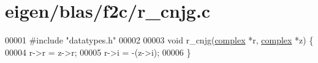 \hypertarget{eigen_2blas_2f2c_2r__cnjg_8c_source}{}\section{eigen/blas/f2c/r\+\_\+cnjg.c}
\label{eigen_2blas_2f2c_2r__cnjg_8c_source}

\begin{DoxyCode}
00001 \textcolor{preprocessor}{#include "datatypes.h"}    
00002 
00003 \textcolor{keywordtype}{void} r\_cnjg(\hyperlink{structcomplex}{complex} *r, \hyperlink{structcomplex}{complex} *z) \{
00004     r->r = z->r;
00005     r->i = -(z->i);
00006 \}
\end{DoxyCode}
